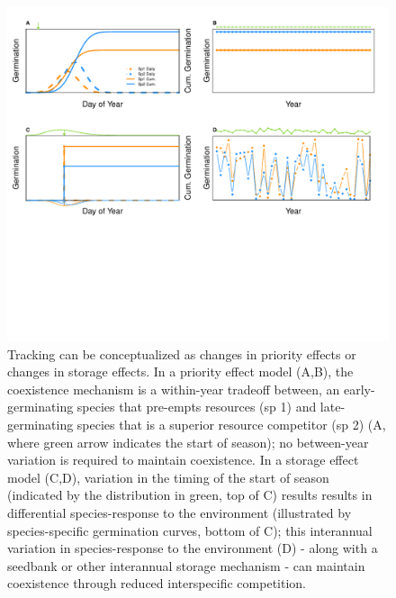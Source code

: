 \documentclass[11pt,letterpaper]{article}
\begin{document}
\begin{figure}[h!]
\centering
\includegraphics[width=1.1\textwidth]{..//..//..//R/graphs/conceptual/PriorityEff_BetHedge.pdf}
\caption{Tracking can be conceptualized as changes in priority effects or changes in storage effects.  In a priority effect model (A,B), the coexistence mechanism is a within-year tradeoff between, an early-germinating species that pre-empts resources (sp 1) and late-germinating species that is a superior resource competitor (sp 2) (A, where green arrow indicates the start of season); no between-year variation is required to maintain coexistence. In a storage effect model (C,D), variation in the timing of the start of season (indicated by the distribution in green, top of C) results results in differential species-response to the environment (illustrated by species-specific germination curves, bottom of C); this interannual variation in species-response to the environment (D) - along with a seedbank or other interannual storage mechanism - can maintain coexistence through reduced interspecific competition.}
\label{fig:conceptmodels} 
\end{figure}


\clearpage
\newpage


\end{document}
